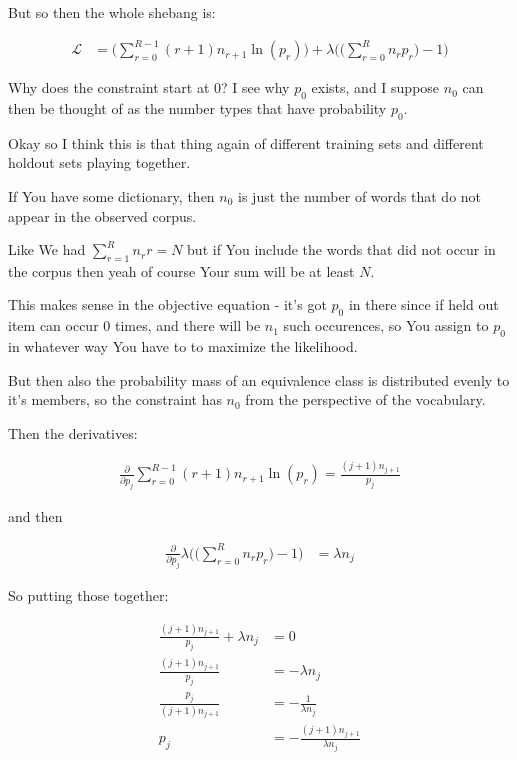 \documentclass{article}
\begin{document}
		But so then the whole shebang is:
		
		\begin{align}
			\mathcal{L} &= \bigg(\sum_{r=0}^{R-1} (r+1)n_{r+1}\ln(p_r)\bigg) +  \lambda \bigg(\bigg(\sum^R_{r=0} n_r p_r\bigg)-1\bigg)
		\end{align}
		
		Why does the constraint start at 0? I see why $p_0$ exists, and I suppose $n_0$ can then be thought of as the number types that have probability $p_0$.
		
		Okay so I think this is that thing again of different training sets and different holdout sets playing together. 
		
		If You have some dictionary, then $n_0$ is just the number of words that do not appear in the observed corpus.
		
		Like We had $\sum_{r=1}^R n_r r = N$ but if You include the words that did not occur in the corpus then yeah of course Your sum will be at least $N$.
		
		This makes sense in the objective equation - it's got $p_0$ in there since if held out item can occur 0 times, and there will be $n_1$ such occurences, so You assign to $p_0$ in whatever way You have to to maximize the likelihood.
		
		But then also the probability mass of an equivalence class is distributed evenly to it's members, so the constraint has $n_0$ from the perspective of the vocabulary.
		
		
		
		Then the derivatives:
		
		\begin{align}
			\frac{\partial}{\partial p_j} \sum_{r=0}^{R-1} (r+1)n_{r+1}\ln(p_r) = \frac{(j+1)n_{j+1}}{p_j}
		\end{align}
		
		and then
		
		\begin{align}
			\frac{\partial}{\partial p_j} \lambda \bigg(\bigg(\sum^R_{r=0} n_r p_r\bigg)-1\bigg) &= \lambda n_j
		\end{align}
		
		So putting those together:
		
		\begin{align}
			\frac{(j+1)n_{j+1}}{p_j} + \lambda n_j &= 0\\
			\frac{(j+1)n_{j+1}}{p_j}  &= - \lambda n_j\\
			\frac{p_j}{(j+1)n_{j+1}}  &= - \frac{1}{\lambda n_j}\\
			p_j  &= - \frac{(j+1)n_{j+1}}{\lambda n_j}
		\end{align}
		
\end{document}
